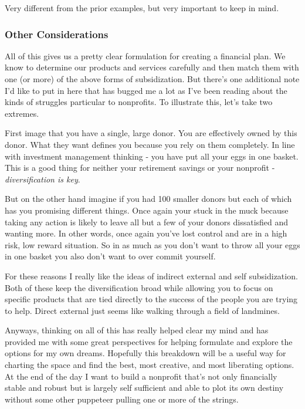 \documentclass[10pt,a5paper]{book}
\begin{document}
Very different from the prior examples, but very important to keep in mind. 

\subsubsection{Other Considerations}
All of this gives us a pretty clear formulation for creating a financial plan. We know to determine our products and services carefully and then match them with one (or more) of the above forms of subsidization. But there's one additional note I'd like to put in here that has bugged me a lot as I've been reading about the kinds of struggles particular to nonprofits. To illustrate this, let's take two extremes. 

First image that you have a single, large donor. You are effectively owned by this donor. What they want defines you because you rely on them completely. In line with investment management thinking - you have put all your eggs in one basket. This is a good thing for neither your retirement savings or your nonprofit - \textit{diversification is key}. 

But on the other hand imagine if you had 100 smaller donors but each of which has you promising different things. Once again your stuck in the muck because taking any action is likely to leave all but a few of your donors dissatisfied and wanting more. In other words, once again you've lost control and are in a high risk, low reward situation. So in as much as you don't want to throw all your eggs in one basket you also don't want to over commit yourself. 

For these reasons I really like the ideas of indirect external and self subsidization. Both of these keep the diversification broad while allowing you to focus on specific products that are tied directly to the success of the people you are trying to help. Direct external just seems like walking through a field of landmines. \linebreak

Anyways, thinking on all of this has really helped clear my mind and has provided me with some great perspectives for helping formulate and explore the options for my own dreams. Hopefully this breakdown will be a useful way for charting the space and find the best, most creative, and most liberating options. At the end of the day I want to build a nonprofit that's not only financially stable and robust but is largely self sufficient and able to plot its own destiny without some other puppeteer pulling one or more of the strings. 
\end{document}
